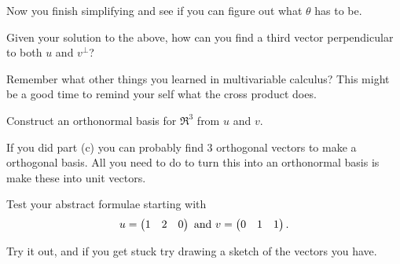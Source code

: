 {\begin{enumext}[label=\alph*,wrap-label=(#1)]
Now you finish simplifying and see if you can figure out what $\theta $ has to be.

\item Given your solution to the above, how can you find a third vector perpendicular to both $u$ and $v^\bot$?

Remember what other things you learned in multivariable calculus? This might be a good time to remind your self what the cross product does.

\item  Construct an orthonormal basis for $\Re^3$ from $u$ and $v$.

If you did part (c) you can probably find 3 orthogonal vectors to make a orthogonal basis. All you need to do to turn this into an orthonormal  basis is make these into unit vectors. 

\item  Test your abstract formulae starting with 
\[
u=\begin{pmatrix} 1 & 2 & 0 \end{pmatrix} \text{ and } v=\begin{pmatrix} 0 & 1 & 1 \end{pmatrix}.
\]

Try it out, and if you get stuck try drawing a sketch of the vectors you have.



\end{enumext}


} %

